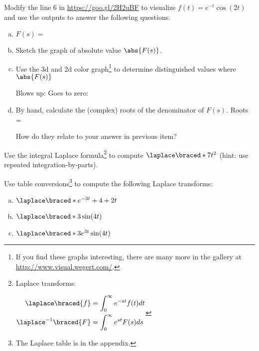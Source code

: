 \begin{sagequestion}
  Modify the line 6 in  \url{https://goo.gl/2H2uBF} to visualize \(f(t) = e^{-t}\cos(2t)\) and use the outputs to answer the following questions.
  \begin{enumerate}[(a)]
  \item \(F(s) = \) \solspace{0.25in}
  \item Sketch the graph of absolute value \(\abs{F(s)}\).
  \item Use the 3d and 2d color graph\footnote{If you find these graphs interesting, there are many more in the gallery at \url{http://www.visual.wegert.com/}.} to determine distinguished values where \(\abs{F(s)}\)

    Blows up: \hspace{2in} Goes to zero: \hspace{2in}

  \item By hand, calculate the (complex) roots of the denominator of \(F(s)\). Roots =

    How do they relate to your answer in previous item? \solspace{0.25in}
  \end{enumerate}


\end{sagequestion}
\newpage
\begin{question}
  Use the integral Laplace formula\footnote{ Laplace transforms:

    \(
    \begin{aligned}
    \laplace\braced{f} &= \int_{0}^{\infty} e^{-st} f(t)dt  \\
    \laplace^{-1}\braced{F} &= \int_{0}^{\infty} e^{st} F(s)ds
  \end{aligned}
    \)
  }  to compute
  \(
    \laplace\braced*{7 t^{2}}
    \) (hint: use repeated integration-by-parts).
    \solspace{2in}
  \end{question}

  \begin{question}
    Use table conversions\footnote{The Laplace table is in the appendix.} to compute the following Laplace transforms:
    \begin{enumerate}[(a)]
    \item \(\laplace\braced*{e^{-3t} + 4+2t} \) \solspace{1in}
    \item \(\laplace\braced*{3 \sin(4t)} \) \solspace{1in}
    \item \(\laplace\braced*{3 e^{3t}\sin(4t)} \) \solspace{1in}
    \end{enumerate}
  \end{question}

